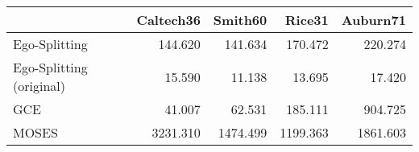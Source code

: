 \begin{tabular}{lrrrr}
\toprule
{} & Caltech36 &  Smith60 &   Rice31 & Auburn71 \\
\midrule
Ego-Splitting            &   144.620 &  141.634 &  170.472 &  220.274 \\
Ego-Splitting (original) &    15.590 &   11.138 &   13.695 &   17.420 \\
GCE                      &    41.007 &   62.531 &  185.111 &  904.725 \\
MOSES                    &  3231.310 & 1474.499 & 1199.363 & 1861.603 \\
\bottomrule
\end{tabular}
